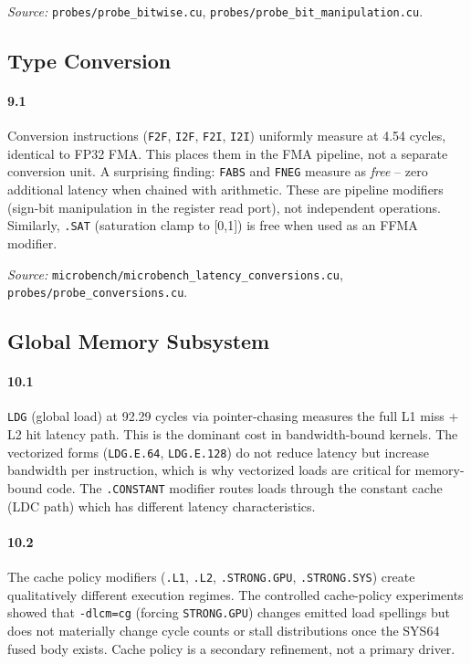 \textit{Source:} \texttt{probes/probe\_bitwise.cu},
\texttt{probes/probe\_bit\_manipulation.cu}.

\subsection{Type Conversion}
\label{par:cvt}

\paragraph{9.1}
Conversion instructions (\texttt{F2F}, \texttt{I2F}, \texttt{F2I},
\texttt{I2I}) uniformly measure at 4.54 cycles, identical to FP32 FMA.
This places them in the FMA pipeline, not a separate conversion unit.
A surprising finding: \texttt{FABS} and \texttt{FNEG} measure as
\emph{free} -- zero additional latency when chained with arithmetic.
These are pipeline modifiers (sign-bit manipulation in the register
read port), not independent operations.  Similarly, \texttt{.SAT}
(saturation clamp to [0,1]) is free when used as an FFMA modifier.

\textit{Source:} \texttt{microbench/microbench\_latency\_conversions.cu},
\texttt{probes/probe\_conversions.cu}.

\subsection{Global Memory Subsystem}
\label{par:memory}

\paragraph{10.1}
\texttt{LDG} (global load) at 92.29 cycles via pointer-chasing measures
the full L1 miss + L2 hit latency path.  This is the dominant cost in
bandwidth-bound kernels.  The vectorized forms (\texttt{LDG.E.64},
\texttt{LDG.E.128}) do not reduce latency but increase bandwidth per
instruction, which is why vectorized loads are critical for memory-bound
code.  The \texttt{.CONSTANT} modifier routes loads through the constant
cache (LDC path) which has different latency characteristics.

\paragraph{10.2}
The cache policy modifiers (\texttt{.L1}, \texttt{.L2},
\texttt{.STRONG.GPU}, \texttt{.STRONG.SYS}) create qualitatively different
execution regimes.  The controlled cache-policy experiments showed that
\texttt{-dlcm=cg} (forcing \texttt{STRONG.GPU}) changes emitted load
spellings but does not materially change cycle counts or stall
distributions once the SYS64 fused body exists.  Cache policy is a
secondary refinement, not a primary driver.

